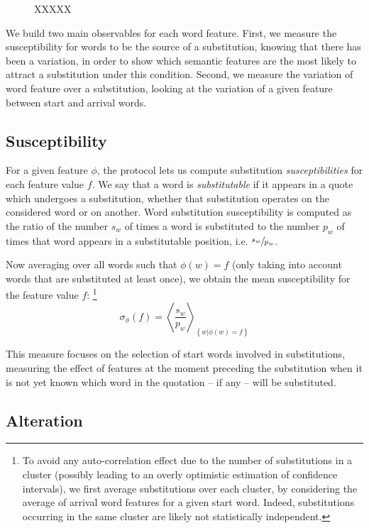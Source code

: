 \begin{figure}[h]
    \centering
    \def\svgwidth{\linewidth}
    \small
    
    \caption{XXXXX}
    \label{fig:substitution-q_max}
\end{figure}

We build two main observables for each word feature.
First, we measure the susceptibility for words to be the source of a substitution, knowing that there has been a variation, in order to show which semantic features are the most likely to attract a substitution under this condition.
Second, we measure the variation of word feature over a substitution, looking at the variation of a given feature between start and arrival words.

\subsection{Susceptibility}

For a given feature $\phi$, the protocol lets us compute substitution \emph{susceptibilities} for each feature value $f$.
We say that a word is \emph{substitutable} if it appears in a quote which undergoes a substitution, whether that substitution operates on the considered word or on another.
Word substitution susceptibility is computed as the ratio of the number $s_w$ of times a word is substituted to the number $p_w$ of times that word appears in a substitutable position, i.e. $\sfrac{s_w}{p_w}$.

Now averaging over all words such that $\phi(w) = f$ (only taking into account words that are substituted at least once), we obtain the mean susceptibility for the feature value $f$:
\footnote{To avoid any auto-correlation effect due to the number of substitutions in a cluster (possibly leading to an overly optimistic estimation of confidence intervals), we first average substitutions over each cluster, by considering the average of arrival word features for a given start word.
Indeed, substitutions occurring in the same cluster are likely not statistically independent.}
$$\sigma_{\phi}(f) = \left< \frac{s_w}{p_w} \right>_{\left\lbrace w | \phi(w) = f \right\rbrace}$$

This measure focuses on the selection of start words involved in substitutions, measuring the effect of features at the moment preceding the substitution when it is not yet known which word in the quotation -- if any -- will be substituted.

\subsection{Alteration}

